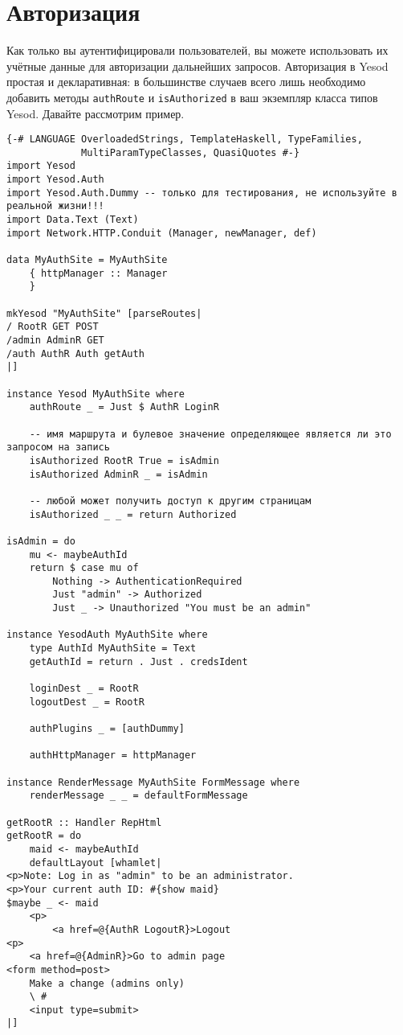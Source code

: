 \section{Авторизация}

Как только вы аутентифицировали пользователей, вы можете использовать их учётные данные для авторизации дальнейших запросов. Авторизация в Yesod простая и декларативная: в большинстве случаев всего лишь необходимо добавить методы \lstinline'authRoute' и \lstinline'isAuthorized' в ваш экземпляр класса типов Yesod. Давайте рассмотрим пример.

\begin{lstlisting}
{-# LANGUAGE OverloadedStrings, TemplateHaskell, TypeFamilies,
             MultiParamTypeClasses, QuasiQuotes #-}
import Yesod
import Yesod.Auth
import Yesod.Auth.Dummy -- только для тестирования, не используйте в реальной жизни!!!
import Data.Text (Text)
import Network.HTTP.Conduit (Manager, newManager, def)

data MyAuthSite = MyAuthSite
    { httpManager :: Manager
    }

mkYesod "MyAuthSite" [parseRoutes|
/ RootR GET POST
/admin AdminR GET
/auth AuthR Auth getAuth
|]

instance Yesod MyAuthSite where
    authRoute _ = Just $ AuthR LoginR

    -- имя маршрута и булевое значение определяющее является ли это запросом на запись
    isAuthorized RootR True = isAdmin
    isAuthorized AdminR _ = isAdmin

    -- любой может получить доступ к другим страницам
    isAuthorized _ _ = return Authorized

isAdmin = do
    mu <- maybeAuthId
    return $ case mu of
        Nothing -> AuthenticationRequired
        Just "admin" -> Authorized
        Just _ -> Unauthorized "You must be an admin"

instance YesodAuth MyAuthSite where
    type AuthId MyAuthSite = Text
    getAuthId = return . Just . credsIdent

    loginDest _ = RootR
    logoutDest _ = RootR

    authPlugins _ = [authDummy]

    authHttpManager = httpManager

instance RenderMessage MyAuthSite FormMessage where
    renderMessage _ _ = defaultFormMessage

getRootR :: Handler RepHtml
getRootR = do
    maid <- maybeAuthId
    defaultLayout [whamlet|
<p>Note: Log in as "admin" to be an administrator.
<p>Your current auth ID: #{show maid}
$maybe _ <- maid
    <p>
        <a href=@{AuthR LogoutR}>Logout
<p>
    <a href=@{AdminR}>Go to admin page
<form method=post>
    Make a change (admins only)
    \ #
    <input type=submit>
|]


\end{lstlisting}
